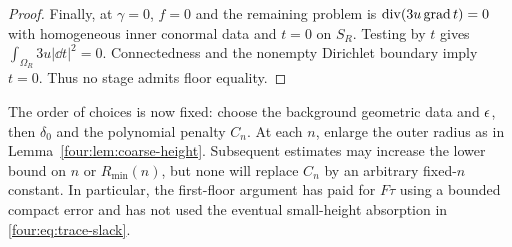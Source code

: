 \begin{proof}
Finally, at $\gamma=0$, $f=0$ and the remaining problem is
$\operatorname{div}(3u\operatorname{grad} t)=0$ with homogeneous inner conormal data and $t=0$
on $S_R$.  Testing by $t$ gives $\int_{\Omega_R}3u|\dd t|^2=0$.
Connectedness and the nonempty Dirichlet boundary imply $t=0$.
Thus no stage admits floor equality.
\end{proof}

The order of choices is now fixed: choose the background geometric
data and $\epsilon$, then $\delta_0$ and the polynomial penalty $C_n$.
At each $n$, enlarge the outer radius as in
Lemma~\ref{four:lem:coarse-height}.  Subsequent estimates may increase the
lower bound on $n$ or $R_{\min}(n)$, but none will replace $C_n$ by an
arbitrary fixed-$n$ constant.  In particular, the first-floor argument
has paid for $F\tau$ using a bounded compact error and has not used the
eventual small-height absorption in \eqref{four:eq:trace-slack}.
